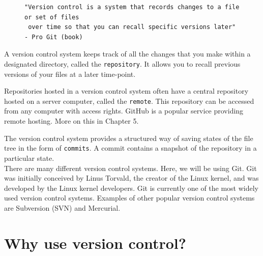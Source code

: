 \documentclass[../main/git_course_main.tex]{subfiles}
\begin{document}

\begin{figure}[h!]
\begin{verbatim}
"Version control is a system that records changes to a file or set of files 
 over time so that you can recall specific versions later"
- Pro Git (book)
\end{verbatim}
\end{figure}

A version control system keeps track of all the changes that you make within a designated directory, called the \verb$repository$. It allows you to recall previous versions of your files at a later time-point.

Repositories hosted in a version control system often have a central repository hosted on a server computer, called the \verb$remote$. This repository can be accessed from any computer with access rights. GitHub is a popular service providing remote hosting. More on this in Chapter 5.

The version control system provides a structured way of saving states of the file tree in the form of \verb$commits$. A commit contains a snapshot of the repository in a particular state. \\

There are many different version control systems. Here, we will be using Git. Git was initially conceived by Linus Torvald, the creator of the Linux kernel, 
and was developed by the Linux kernel developers. Git is currently one of the most widely used version control systems. Examples of other popular version control systems are Subversion (SVN) and Mercurial.

\section{Why use version control?}

%
\end{document}
